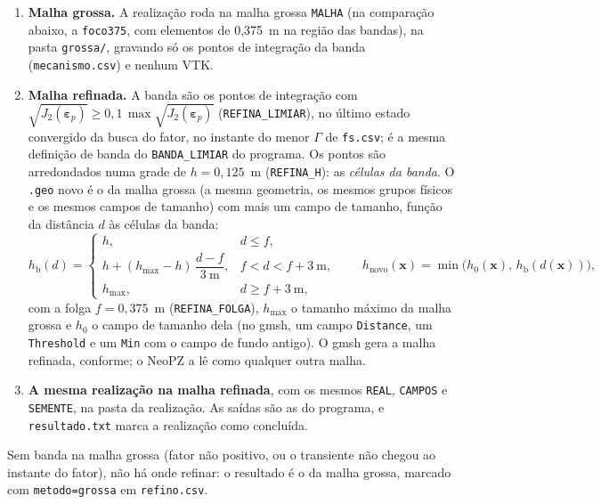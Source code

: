 \begin{enumerate}
\item \textbf{Malha grossa.} A realização roda na malha grossa \texttt{MALHA} (na comparação abaixo, a
  \texttt{foco375}, com elementos de 0,375~m na região das bandas), na pasta \texttt{grossa/}, gravando só os pontos
  de integração da banda (\texttt{mecanismo.csv}) e nenhum VTK.
\item \textbf{Malha refinada.} A banda são os pontos de integração com
  $\sqrt{J_2(\bm\varepsilon_p)} \ge 0{,}1\,\max \sqrt{J_2(\bm\varepsilon_p)}$ (\texttt{REFINA\_LIMIAR}), no último
  estado convergido da busca do fator, no instante do menor $\Gamma$ de \texttt{fs.csv}; é a mesma definição de banda do
  \texttt{BANDA\_LIMIAR} do programa. Os pontos são arredondados numa grade de $h = 0{,}125$~m (\texttt{REFINA\_H}):
  as \emph{células da banda}. O \texttt{.geo} novo é o da malha grossa (a mesma geometria, os mesmos grupos físicos e
  os mesmos campos de tamanho) com mais um campo de tamanho, função da distância $d$ às células da banda:
  \begin{equation}
    h_{\mathrm{b}}(d) =
    \begin{cases}
      h, & d \le f,\\[2pt]
      h + (h_{\max} - h)\,\dfrac{d - f}{3~\mathrm{m}}, & f < d < f + 3~\mathrm{m},\\[6pt]
      h_{\max}, & d \ge f + 3~\mathrm{m},
    \end{cases}
    \qquad
    h_{\mathrm{novo}}(\bm x) = \min\bigl(h_0(\bm x),\, h_{\mathrm{b}}(d(\bm x))\bigr),
    \label{eq:ref:campo}
  \end{equation}
  com a folga $f = 0{,}375$~m (\texttt{REFINA\_FOLGA}), $h_{\max}$ o tamanho máximo da malha grossa e $h_0$ o campo de
  tamanho dela (no gmsh, um campo \texttt{Distance}, um \texttt{Threshold} e um \texttt{Min} com o campo de fundo
  antigo). O gmsh gera a malha refinada, conforme; o NeoPZ a lê como qualquer outra malha.
\item \textbf{A mesma realização na malha refinada}, com os mesmos \texttt{REAL}, \texttt{CAMPOS} e \texttt{SEMENTE},
  na pasta da realização. As saídas são as do programa, e \texttt{resultado.txt} marca a realização como concluída.
\end{enumerate}
Sem banda na malha grossa (fator não positivo, ou o transiente não chegou ao instante do fator), não há onde refinar: o
resultado é o da malha grossa, marcado com \texttt{metodo=grossa} em \texttt{refino.csv}.

